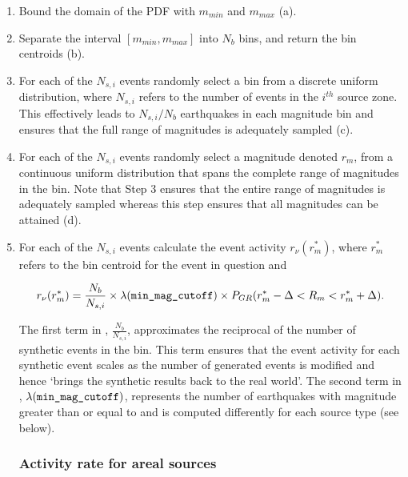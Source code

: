 \begin{enumerate}
\item Bound the domain of the PDF with $m_{min}$ and $m_{max}$
(a).

\item Separate the interval $[m_{min}, m_{max}]$ into $N_b$ bins,
and return the bin centroids (b).

\item For each of the $N_{s,i}$ events randomly select a bin from
a discrete uniform
  distribution, where $N_{s,i}$ refers to the number of events in the $i^{th}$ source zone.
  This effectively leads to $N_{s,i}/N_b$ earthquakes in
  each magnitude bin and ensures that the full range of magnitudes
  is adequately sampled (c).

\item For each of the $N_{s,i}$ events randomly select a magnitude
denoted $r_m$, from a
  continuous uniform distribution that spans the complete range of magnitudes in the
  bin. Note that Step 3 ensures that the entire range of magnitudes is
  adequately sampled whereas this step ensures that all magnitudes can be
  attained (d).

\item For each of the $N_{s,i}$ events calculate the event
activity $r_\nu(r_m^*)$, where $r_m^*$ refers to the bin centroid
for the event in question and

\begin{equation}
\label{eq:event-activity} r_\nu(r_m^*) = \frac{N_b}{N_{s,i}}
\times \lambda(\typepar{min}{\_mag}{\_cutoff}) \times
P_{GR}(r_m^*-\Delta<R_m<r_m^*+\Delta).
\end{equation}

The first term in , $\frac{N_b}{N_{s,i}}$,
approximates the reciprocal of the number of synthetic events in
the bin. This term ensures that the event activity for each
synthetic event scales as the number of generated events is
modified and hence `brings the synthetic results back to the real
world'. The second term in ,
$\lambda(\typepar{min}{\_mag}{\_cutoff})$, represents the number
of earthquakes with magnitude greater than or equal to
 and is computed differently for each source type (see below).

\subsubsection{Activity rate for areal sources} 
\label{sec:rv_areal_GR}



\end{enumerate}
